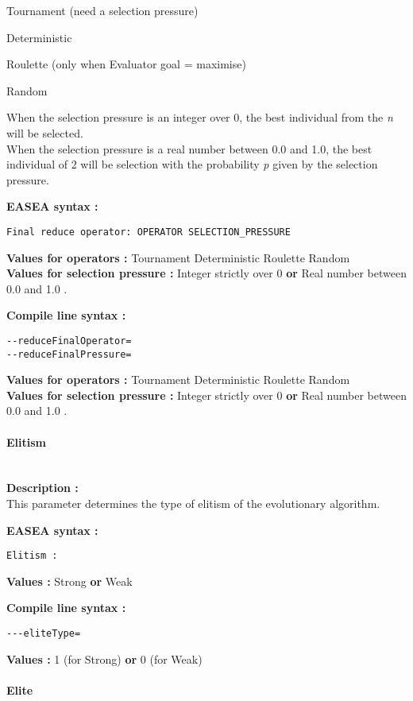 \documentclass{book}
\begin{document}
Tournament (need a selection pressure)

Deterministic

Roulette (only when Evaluator goal = maximise)

Random

When the selection pressure is an integer over 0, the best individual
from the \emph{n} will be selected.\\When the selection pressure is a
real number between 0.0 and 1.0, the best individual of 2 will be
selection with the probability \emph{p} given by the selection pressure.

\textbf{EASEA syntax :}

\texttt{Final~reduce~operator:~OPERATOR~SELECTION\_PRESSURE}

\textbf{Values for operators :} Tournament Deterministic Roulette
Random\\\textbf{Values for selection pressure :} Integer strictly over 0
\textbf{or} Real number between 0.0 and 1.0 .

\textbf{Compile line syntax :}

\texttt{-{}-reduceFinalOperator=}\\\texttt{-{}-reduceFinalPressure=}

\textbf{Values for operators :} Tournament Deterministic Roulette
Random\\\textbf{Values for selection pressure :} Integer strictly over 0
\textbf{or} Real number between 0.0 and 1.0 .

\paragraph{Elitism}\label{elitism}
~\\

\textbf{Description :}\\This parameter determines the type of elitism of
the evolutionary algorithm.

\textbf{EASEA syntax :}

\texttt{Elitism~:}

\textbf{Values :} Strong \textbf{or} Weak

\textbf{Compile line syntax :}

\texttt{-{}-{}-eliteType=}

\textbf{Values :} 1 (for Strong) \textbf{or} 0 (for Weak)

\paragraph{Elite}\label{elite}
~\\
\end{document}
